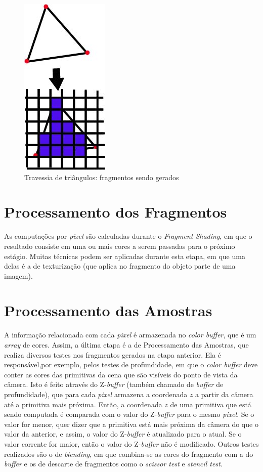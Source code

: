\begin{anexosenv}
  \begin{figure}[ht]
       \centering
	\includegraphics[keepaspectratio=true,scale=0.8]{figuras/traversal.jpg}
       \caption{Travessia de triângulos: fragmentos sendo gerados}
       \label{traversal}
       \end{figure}

\section{Processamento dos Fragmentos}

	As computações por \textit{pixel} são calculadas durante o \textit{Fragment Shading}, em que o resultado consiste em uma ou mais cores a serem passadas para o próximo estágio. Muitas técnicas podem ser aplicadas durante esta etapa, em que uma delas é a de texturização (que aplica no fragmento do objeto parte de uma imagem). 

\section{Processamento das Amostras}

	 A informação relacionada com cada \textit{pixel} é armazenada no \textit{color buffer}, que é um \textit{array} de cores. Assim, a última etapa é a de Processamento das Amostras, que realiza diversos testes nos fragmentos gerados na etapa anterior. Ela é responsável,por exemplo, pelos testes de profundidade, em que o \textit{color buffer} deve conter as cores das primitivas da cena que são visíveis do ponto de vista da câmera. Isto é feito através do Z-\textit{buffer} (também chamado de \textit{buffer} de profundidade), que para cada \textit{pixel} armazena a coordenada $z$ a partir da câmera até a primitiva mais próxima.  Então, a coordenada $z$ de uma primitiva que está sendo computada é comparada com  o valor do Z-\textit{buffer} para o mesmo \textit{pixel}. Se o valor for menor, quer dizer que a primitiva está mais próxima da câmera do que o valor da anterior, e assim, o valor do Z-\textit{buffer} é atualizado para o atual. Se o valor corrente for maior, então o valor do Z-\textit{buffer} não é modificado. Outros testes realizados são o de \textit{blending}, em que combina-se as cores do fragmento com a do \textit{buffer} e os de descarte de fragmentos como o \textit{scissor test} e \textit{stencil test}. 	

\end{anexosenv}

